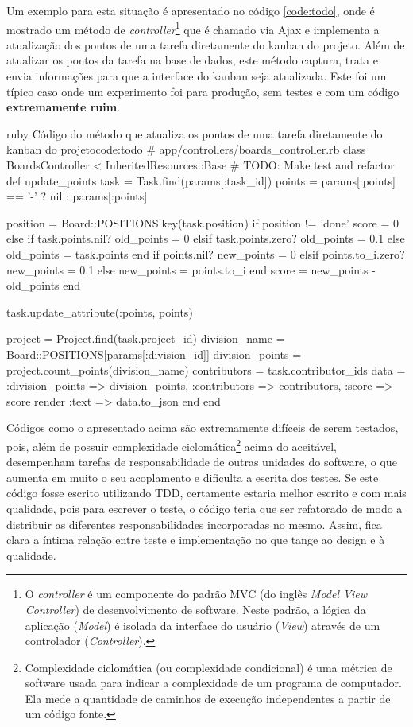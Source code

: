 Um exemplo para esta situação é apresentado no código \ref{code:todo}, onde é mostrado um método de \textit{controller}\footnote{O \textit{controller} é um componente do padrão MVC (do inglês \textit{Model View Controller}) de desenvolvimento de software. Neste padrão, a lógica da aplicação (\textit{Model}) é isolada da interface do usuário (\textit{View}) através de um controlador (\textit{Controller}).} que é chamado via Ajax e implementa a atualização dos pontos de uma tarefa diretamente do kanban do projeto. Além de atualizar os pontos da tarefa na base de dados, este método captura, trata e envia informações para que a interface do kanban seja atualizada. Este foi um típico caso onde um experimento foi para produção, sem testes e com um código \textbf{extremamente ruim}.

\newpage

\begin{mycode}{ruby}%
{Código do método que atualiza os pontos de uma tarefa diretamente do kanban do projeto}{code:todo}
# app/controllers/boards_controller.rb
class BoardsController < InheritedResources::Base
  # TODO: Make test and refactor
  def update_points
    task = Task.find(params[:task_id])
    points = params[:points] == '-' ? nil : params[:points]

    position = Board::POSITIONS.key(task.position)
    if position != 'done'
      score = 0
    else
      if task.points.nil?
        old_points = 0
      elsif task.points.zero?
        old_points = 0.1
      else
        old_points = task.points
      end
      if points.nil?
        new_points = 0
      elsif points.to_i.zero?
        new_points = 0.1
      else
        new_points = points.to_i
      end
      score = new_points - old_points
    end

    task.update_attribute(:points, points)

    project = Project.find(task.project_id)
    division_name = Board::POSITIONS[params[:division_id]]
    division_points = project.count_points(division_name)
    contributors = task.contributor_ids
    data = { :division_points => division_points,
             :contributors => contributors,
             :score => score }
    render :text => data.to_json
  end
end
\end{mycode}

Códigos como o apresentado acima são extremamente difíceis de serem testados, pois, além de possuir complexidade ciclomática\footnote{Complexidade ciclomática (ou complexidade condicional) é uma métrica de software usada para indicar a complexidade de um programa de computador. Ela mede a quantidade de caminhos de execução independentes a partir de um código fonte.} acima do aceitável, desempenham tarefas de responsabilidade de outras unidades do software, o que aumenta em muito o seu acoplamento e dificulta a escrita dos testes. Se este código fosse escrito utilizando TDD, certamente estaria melhor escrito e com mais qualidade, pois para escrever o teste, o código teria que ser refatorado de modo a distribuir as diferentes responsabilidades incorporadas no mesmo. Assim, fica clara a íntima relação entre teste e implementação no que tange ao design e à qualidade.

